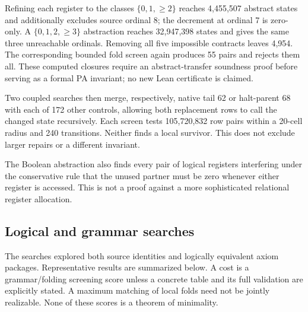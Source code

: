 \documentclass[11pt,a4paper]{article}
\begin{document}
Refining each register to the classes $\{0,1,\geq2\}$ reaches 4,455,507 abstract states and additionally excludes source ordinal 8; the decrement at ordinal 7 is zero-only. A $\{0,1,2,\geq3\}$ abstraction reaches 32,947,398 states and gives the same three unreachable ordinals. Removing all five impossible contracts leaves 4,954. The corresponding bounded fold screen again produces 55 pairs and rejects them all. These computed closures require an abstract-transfer soundness proof before serving as a formal PA invariant; no new Lean certificate is claimed.

Two coupled searches then merge, respectively, native tail 62 or halt-parent 68 with each of 172 other controls, allowing both replacement rows to call the changed state recursively. Each screen tests 105,720,832 row pairs within a 20-cell radius and 240 transitions. Neither finds a local survivor. This does not exclude larger repairs or a different invariant.

The Boolean abstraction also finds every pair of logical registers interfering under the conservative rule that the unused partner must be zero whenever either register is accessed. This is not a proof against a more sophisticated relational register allocation.

\subsection{Logical and grammar searches}

The searches explored both source identities and logically equivalent axiom packages. Representative results are summarized below. A cost is a grammar/folding screening score unless a concrete table and its full validation are explicitly stated. A maximum matching of local folds need not be jointly realizable. None of these scores is a theorem of minimality.
\end{document}
